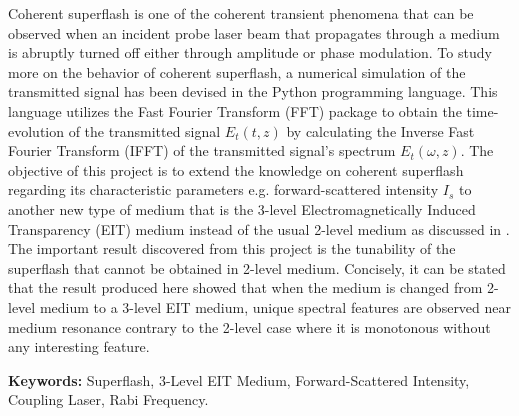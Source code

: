 
Coherent superflash is one of the coherent transient phenomena that can be observed when an incident probe laser beam that propagates through a medium is abruptly turned off either through amplitude or phase modulation. To study more on the behavior of coherent superflash, a numerical simulation of the transmitted signal has been devised in the Python programming language. This language utilizes the Fast Fourier Transform (FFT) package to obtain the time-evolution of the transmitted signal $E_{t}(t, z)$ by calculating the Inverse Fast Fourier Transform (IFFT) of the transmitted signal's spectrum $E_{t}(\omega, z)$. The objective of this project is to extend the knowledge on coherent superflash regarding its characteristic parameters e.g. forward-scattered intensity $I_{s}$ to another new type of medium that is the 3-level Electromagnetically Induced Transparency (EIT) medium instead of the usual 2-level medium as discussed in \cite{Kwong2014}. The important result discovered from this project is the tunability of the superflash that cannot be obtained in 2-level medium. Concisely, it can be stated that the result produced here showed that when the medium is changed from 2-level medium to a 3-level EIT medium, unique spectral features are observed near medium resonance contrary to the 2-level case where it is monotonous without any interesting feature.

\textbf{Keywords: } Superflash, 3-Level EIT Medium, Forward-Scattered Intensity, Coupling Laser, Rabi Frequency.
